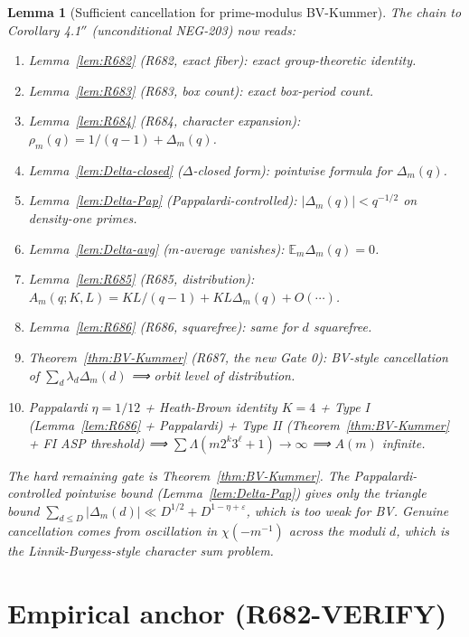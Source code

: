 \documentclass[12pt]{amsart}
\newtheorem{lemma}{Lemma}
\theoremstyle{definition}
\theoremstyle{remark}
\begin{document}
\begin{lemma}[Sufficient cancellation for prime-modulus BV-Kummer]
The chain to Corollary 4.1$''$ (unconditional NEG-203) now reads:

\begin{enumerate}
\item Lemma~\ref{lem:R682} (R682, exact fiber): exact group-theoretic identity.
\item Lemma~\ref{lem:R683} (R683, box count): exact box-period count.
\item Lemma~\ref{lem:R684} (R684, character expansion): $\rho_m(q) = 1/(q-1) + \Delta_m(q)$.
\item Lemma~\ref{lem:Delta-closed} ($\Delta$-closed form): pointwise formula for $\Delta_m(q)$.
\item Lemma~\ref{lem:Delta-Pap} (Pappalardi-controlled): $|\Delta_m(q)| < q^{-1/2}$ on density-one primes.
\item Lemma~\ref{lem:Delta-avg} ($m$-average vanishes): $\mathbb{E}_m \Delta_m(q) = 0$.
\item Lemma~\ref{lem:R685} (R685, distribution): $A_m(q; K, L) = KL/(q-1) + KL \Delta_m(q) + O(\cdots)$.
\item Lemma~\ref{lem:R686} (R686, squarefree): same for $d$ squarefree.
\item Theorem~\ref{thm:BV-Kummer} (R687, the new Gate 0): BV-style cancellation of $\sum_d \lambda_d \Delta_m(d)$ ⟹ orbit level of distribution.
\item Pappalardi $\eta = 1/12$ + Heath-Brown identity $K = 4$ + Type I (Lemma~\ref{lem:R686} + Pappalardi) + Type II (Theorem~\ref{thm:BV-Kummer} + FI ASP threshold) ⟹ $\sum \Lambda(m 2^k 3^\ell + 1) \to \infty$ ⟹ $A(m)$ infinite.
\end{enumerate}

The hard remaining gate is Theorem~\ref{thm:BV-Kummer}. The Pappalardi-controlled pointwise
bound (Lemma~\ref{lem:Delta-Pap}) gives only the triangle bound
$\sum_{d \le D} |\Delta_m(d)| \ll D^{1/2} + D^{1-\eta+\varepsilon}$, which is too weak for BV.
Genuine cancellation comes from oscillation in $\chi(-m^{-1})$ across the moduli $d$, which
is the Linnik-Burgess-style character sum problem.

\section{Empirical anchor (R682-VERIFY)}


\end{lemma}
\end{document}
